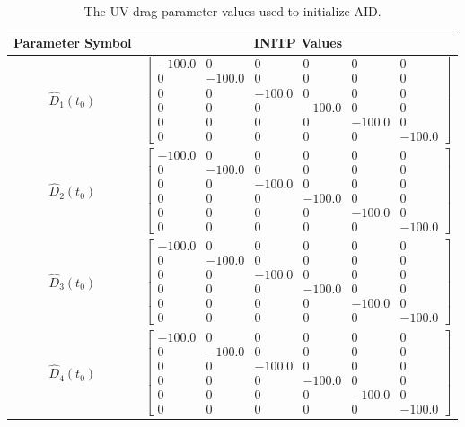 \begin{table}[htbp]
\ssp
\caption{The \ac{UV} drag parameter values used to initialize \ac{AID}.}
\begin{center}
\begin{tabular}{c|c}
Parameter Symbol & \ac{INITP} Values \\ \hline
$\hat{D}_1(t_0)$ & $ \left[\begin{array}{cccccc} -100.0 & 0 & 0 & 0 & 0 & 0\\ 0 & -100.0 & 0 & 0 & 0 & 0\\ 0 & 0 & -100.0 & 0 & 0 & 0\\ 0 & 0 & 0 & -100.0 & 0 & 0\\ 0 & 0 & 0 & 0 & -100.0 & 0\\ 0 & 0 & 0 & 0 & 0 & -100.0 \end{array}\right] $ \\ 
$\hat{D}_2(t_0)$ & $ \left[\begin{array}{cccccc} -100.0 & 0 & 0 & 0 & 0 & 0\\ 0 & -100.0 & 0 & 0 & 0 & 0\\ 0 & 0 & -100.0 & 0 & 0 & 0\\ 0 & 0 & 0 & -100.0 & 0 & 0\\ 0 & 0 & 0 & 0 & -100.0 & 0\\ 0 & 0 & 0 & 0 & 0 & -100.0 \end{array}\right] $ \\ 
$\hat{D}_3(t_0)$ & $ \left[\begin{array}{cccccc} -100.0 & 0 & 0 & 0 & 0 & 0\\ 0 & -100.0 & 0 & 0 & 0 & 0\\ 0 & 0 & -100.0 & 0 & 0 & 0\\ 0 & 0 & 0 & -100.0 & 0 & 0\\ 0 & 0 & 0 & 0 & -100.0 & 0\\ 0 & 0 & 0 & 0 & 0 & -100.0 \end{array}\right] $ \\ 
$\hat{D}_4(t_0)$ & $ \left[\begin{array}{cccccc} -100.0 & 0 & 0 & 0 & 0 & 0\\ 0 & -100.0 & 0 & 0 & 0 & 0\\ 0 & 0 & -100.0 & 0 & 0 & 0\\ 0 & 0 & 0 & -100.0 & 0 & 0\\ 0 & 0 & 0 & 0 & -100.0 & 0\\ 0 & 0 & 0 & 0 & 0 & -100.0 \end{array}\right] $ \\ 

\end{tabular}
\end{center}
\end{table}
